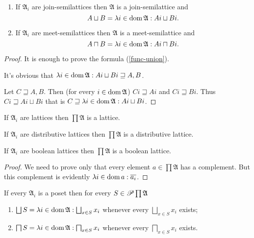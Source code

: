 \begin{prop}
~
\begin{enumerate}
\item If $\mathfrak{A}_{i}$ are join-semilattices then $\mathfrak{A}$
is a join-semilattice and 
\begin{equation}
A\sqcup B=\lambda i\in\operatorname{dom}\mathfrak{A}:Ai\sqcup Bi.\label{func-union}
\end{equation}

\item If $\mathfrak{A}_{i}$ are meet-semilattices then $\mathfrak{A}$
is a meet-semilattice and 
\[
A\sqcap B=\lambda i\in\operatorname{dom}\mathfrak{A}:Ai\sqcap Bi.
\]

\end{enumerate}
\end{prop}
\begin{proof}
It is enough to prove the formula (\ref{func-union}).

It's obvious that $\lambda i\in\operatorname{dom}\mathfrak{A}:Ai\sqcup Bi\sqsupseteq A,B$.

Let $C\sqsupseteq A,B$. Then (for every $i\in\operatorname{dom}\mathfrak{A}$)
$Ci\sqsupseteq Ai$ and $Ci\sqsupseteq Bi$. Thus $Ci\sqsupseteq Ai\sqcup Bi$
that is $C\sqsupseteq\lambda i\in\operatorname{dom}\mathfrak{A}:Ai\sqcup Bi$.\end{proof}
\begin{cor}
If $\mathfrak{A}_{i}$ are lattices then $\prod\mathfrak{A}$ is a lattice.\end{cor}
\begin{obvious}
If $\mathfrak{A}_{i}$ are distributive lattices then $\prod\mathfrak{A}$
is a distributive lattice.\end{obvious}
\begin{prop}
If $\mathfrak{A}_{i}$ are boolean lattices then $\prod\mathfrak{A}$
is a boolean lattice.\end{prop}
\begin{proof}
We need to prove only that every element $a\in\prod\mathfrak{A}$
has a complement. But this complement is evidently $\lambda i\in\operatorname{dom} a:\overline{a_{i}}$.\end{proof}
\begin{prop}
If every $\mathfrak{A}_{i}$ is a poset then for every $S\in\mathscr{P}\prod\mathfrak{A}$
\begin{enumerate}
\item $\bigsqcup S=\lambda i\in\operatorname{dom}\mathfrak{A}:\bigsqcup_{x\in S}x_{i}$
whenever every $\bigsqcup_{x\in S}x_{i}$ exists;
\item $\bigsqcap S=\lambda i\in\operatorname{dom}\mathfrak{A}:\bigsqcap_{x\in S}x_{i}$
whenever every $\bigsqcap_{x\in S}x_{i}$ exists.
\end{enumerate}
\end{prop}
